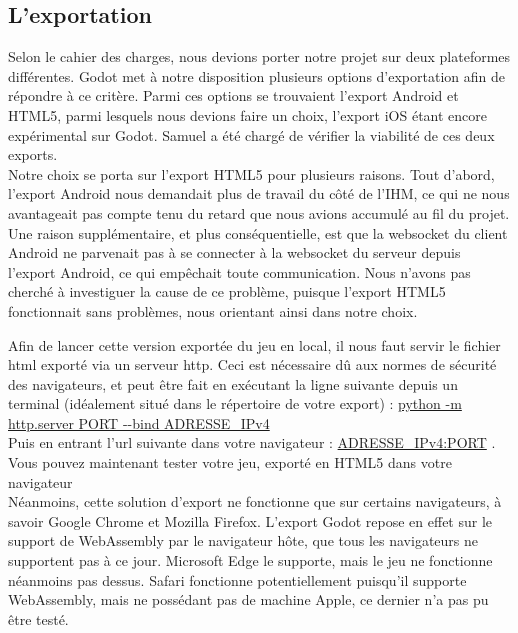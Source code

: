 \documentclass[a4paper,11pt]{article}
\begin{document}
\subsection{L’exportation}

Selon le cahier des charges, nous devions porter notre projet sur deux plateformes différentes. Godot met à notre disposition plusieurs options d'exportation afin de répondre à ce critère. Parmi ces options se trouvaient l’export Android et HTML5, parmi lesquels nous devions faire un choix, l’export iOS étant encore expérimental sur Godot. Samuel a été chargé de vérifier la viabilité de ces deux exports. \\ 

Notre choix se porta sur l’export HTML5 pour plusieurs raisons. Tout d’abord, l’export Android nous demandait plus de travail du côté de l’IHM, ce qui ne nous avantageait pas compte tenu du retard que nous avions accumulé au fil du projet. Une raison supplémentaire, et plus conséquentielle, est que la websocket du client Android ne parvenait pas à se connecter à la websocket du serveur depuis l’export Android, ce qui empêchait toute communication. Nous n’avons pas cherché à investiguer la cause de ce problème, puisque l’export HTML5 fonctionnait sans problèmes, nous orientant ainsi dans notre choix.  \\

\newpage

Afin de lancer cette version exportée du jeu en local, il nous faut servir le fichier html exporté via un serveur http. Ceci est nécessaire dû aux normes de sécurité des navigateurs, et peut être fait en exécutant la ligne suivante depuis un terminal (idéalement situé dans le répertoire de votre export) : 
\url{python -m http.server PORT --bind ADRESSE_IPv4} \\


 Puis en entrant l’url suivante dans votre navigateur :  \url{ADRESSE_IPv4:PORT} . Vous pouvez maintenant tester votre jeu, exporté en HTML5 dans votre navigateur \\

Néanmoins, cette solution d’export ne fonctionne que sur certains navigateurs, à savoir Google Chrome et Mozilla Firefox. L’export Godot repose en effet sur le support de WebAssembly par le navigateur hôte, que tous les navigateurs ne supportent pas à ce jour. Microsoft Edge le supporte, mais le jeu ne fonctionne néanmoins pas dessus. Safari fonctionne potentiellement puisqu’il supporte WebAssembly, mais ne possédant pas de machine Apple, ce dernier n’a pas pu être testé. \\
\end{document}
